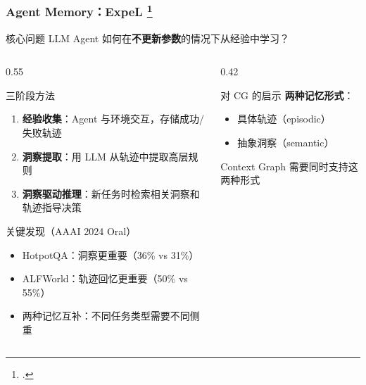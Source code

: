 \documentclass[aspectratio=169,10pt]{beamer}
\let\oldcite\cite
\renewcommand{\cite}[1]{\oldcite{#1}\footcitetext{#1}}
\begin{document}
\begin{frame}
  \frametitle{Agent Memory：ExpeL \cite{zhao2024expel}}

  \begin{block}{核心问题}
    LLM Agent 如何在\textbf{不更新参数}的情况下从经验中学习？
  \end{block}

  \begin{columns}[T]
    \begin{column}{0.55\textwidth}
      \begin{block}{三阶段方法}
        \begin{enumerate}
          \item \textbf{经验收集}：Agent 与环境交互，存储成功/失败轨迹
          \item \textbf{洞察提取}：用 LLM 从轨迹中提取高层规则
          \item \textbf{洞察驱动推理}：新任务时检索相关洞察和轨迹指导决策
        \end{enumerate}
      \end{block}

      \begin{block}{关键发现（AAAI 2024 Oral）}
        \begin{itemize}
          \item HotpotQA：洞察更重要（36\% vs 31\%）
          \item ALFWorld：轨迹回忆更重要（50\% vs 55\%）
          \item 两种记忆互补：不同任务类型需要不同侧重
        \end{itemize}
      \end{block}
    \end{column}

    \begin{column}{0.42\textwidth}
      \begin{alertblock}{对 CG 的启示}
        \textbf{两种记忆形式}：
        \begin{itemize}
          \item 具体轨迹（episodic）
          \item 抽象洞察（semantic）
        \end{itemize}
        \vspace{0.2cm}
        Context Graph 需要同时支持这两种形式
      \end{alertblock}
    \end{column}
  \end{columns}
\end{frame}
\end{document}
